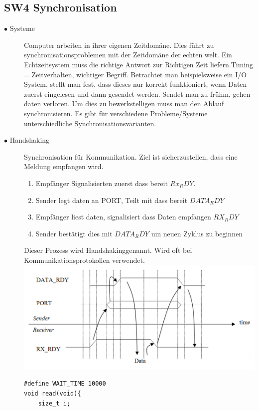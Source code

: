 \documentclass[a4paper, 8pt]{extarticle}
\begin{document}
\begin{multicols*}{3}
	\section{SW4 Synchronisation}
					\begin{description}
						\item[$\bullet$ Systeme]
							Computer arbeiten in ihrer eigenen Zeitdomäne. Dies führt zu synchronisationsproblemen mit der Zeitdomäne der echten welt.
							Ein Echtzeitsystem muss die richtige Antwort zur Richtigen Zeit liefern.Timing =  Zeitverhalten, wichtiger Begriff.
							Betrachtet man beispielsweise ein I/O System, stellt man fest, dass dieses nur korrekt funktioniert, wenn Daten zuerst eingelesen und dann gesendet werden.
							Sendet man zu frühm, gehen daten verloren. Um dies zu bewerkstelligen muss man den Ablauf synchronisieren. Es gibt für verschiedene Probleme/Systeme unterschiedliche
							Synchronisationsvarianten.
						\item[$\bullet$ Handshaking]
							Synchronisation für Kommunikation. Ziel ist sicherzustellen, dass eine Meldung empfangen wird. 
							\begin{enumerate}
								\item Empfänger Signalisierten zuerst dass bereit $Rx_RDY$.
								\item Sender legt daten an PORT, Teilt mit dass bereit $DATA_RDY$
								\item Empfänger liest daten, signalisiert dass Daten empfangen $RX_RDY$
								\item Sender bestätigt dies mit $DATA_RDY$ um neuen Zyklus zu beginnen
							\end{enumerate}
							Dieser Prozess wird \dq Handshaking\dq genannt. Wird oft bei Kommunikationsprotokollen verwendet.
							\includegraphics[width=1.1\linewidth,left]{img/Handshaking_Ablauf.PNG}
							\begin{lstlisting}
#define WAIT_TIME 10000
void read(void){
	size_t i;


\end{lstlisting}
\end{description}
\end{multicols*}
\end{document}
